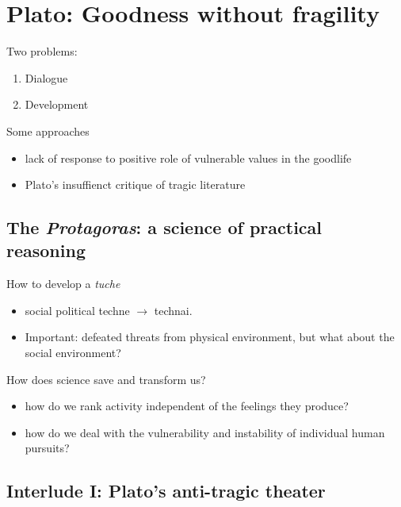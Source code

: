 \documentclass[
]{book}
\providecommand{\tightlist}{%
  \setlength{\itemsep}{0pt}\setlength{\parskip}{0pt}}
\begin{document}
\section{Plato: Goodness without fragility}\label{plato-goodness-without-fragility}

Two problems:

\begin{enumerate}
\def\labelenumi{\arabic{enumi}.}
\tightlist
\item
  Dialogue
\item
  Development
\end{enumerate}

Some approaches

\begin{itemize}
\tightlist
\item
  lack of response to positive role of vulnerable values in the goodlife
\item
  Plato's insuffienct critique of tragic literature
\end{itemize}

\subsection{\texorpdfstring{The \emph{Protagoras}: a science of practical reasoning}{The Protagoras: a science of practical reasoning}}\label{the-protagoras-a-science-of-practical-reasoning}

How to develop a \emph{tuche}

\begin{itemize}
\tightlist
\item
  social political techne \(\rightarrow\) technai.
\item
  Important: defeated threats from physical environment, but what about the social environment?
\end{itemize}

How does science save and transform us?

\begin{itemize}
\tightlist
\item
  how do we rank activity independent of the feelings they produce?
\item
  how do we deal with the vulnerability and instability of individual human pursuits?
\end{itemize}

\subsection{Interlude I: Plato's anti-tragic theater}\label{interlude-i-platos-anti-tragic-theater}
\end{document}
